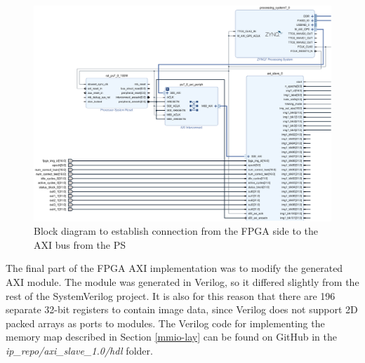 \begin{figure}
	\centering 
	\includegraphics[width=\textwidth]{figures/fpga_axi_block}
	\caption{Block diagram to establish connection from the FPGA side to the AXI bus from the PS}\label{system-bd}
\end{figure}

The final part of the FPGA AXI implementation was to modify the generated AXI module. The module was generated in Verilog, so it differed slightly from the rest of the SystemVerilog project. It is also for this reason that there are 196 separate 32-bit registers to contain image data, since Verilog does not support 2D packed arrays as ports to modules. The Verilog code for implementing the memory map described in Section \ref{mmio-lay} can be found on GitHub in the \textit{ip\_repo/axi\_slave\_1.0/hdl} folder.

